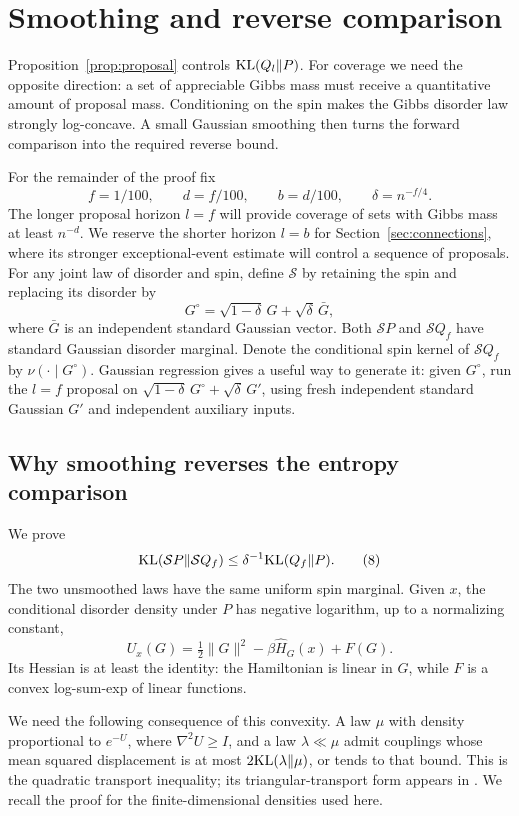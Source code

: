 \section{Smoothing and reverse comparison}\label{sec:reverse}

Proposition~\ref{prop:proposal} controls ${\rm KL}(Q_l\Vert P)$.
For coverage we need the opposite direction: a set of appreciable
Gibbs mass must receive a quantitative amount of proposal mass.
Conditioning on the spin makes the Gibbs disorder law strongly
log-concave. A small Gaussian smoothing then turns the forward
comparison into the required reverse bound.

For the remainder of the proof fix
\[
 f=1/100,\qquad d=f/100,\qquad b=d/100,
 \qquad \delta=n^{-f/4}.
\]
The longer proposal horizon $l=f$ will provide coverage of sets with
Gibbs mass at least $n^{-d}$. We reserve the shorter horizon $l=b$
for Section~\ref{sec:connections}, where its stronger exceptional-event
estimate will control a sequence of proposals. For any joint law of
disorder and spin, define $\mathcal S$ by retaining the spin
and replacing its disorder by
\[
 G^\circ=\sqrt{1-\delta}\,G+\sqrt\delta\,\bar G,
\]
where $\bar G$ is an independent standard Gaussian vector.
Both $\mathcal SP$ and $\mathcal SQ_f$ have standard Gaussian
disorder marginal. Denote the conditional spin kernel of
$\mathcal SQ_f$ by $\nu(\cdot\mid G^\circ)$. Gaussian regression
gives a useful way to generate it: given $G^\circ$, run the
$l=f$ proposal on
$\sqrt{1-\delta}\,G^\circ+\sqrt\delta\,G'$, using fresh independent
standard Gaussian $G'$ and independent auxiliary inputs.

\subsection{Why smoothing reverses the entropy comparison}

We prove
\[
 {\rm KL}(\mathcal SP\Vert\mathcal SQ_f)
 \le\delta^{-1}{\rm KL}(Q_f\Vert P).
 \tag{8}\label{eq:8}
\]
The two unsmoothed laws have the same uniform spin marginal. Given
$x$, the conditional disorder density under $P$ has negative logarithm,
up to a normalizing constant,
\[
 U_x(G)=\tfrac12\|G\|^2-\beta\widehat H_G(x)+F(G).
\]
Its Hessian is at least the identity: the Hamiltonian is linear in
$G$, while $F$ is a convex log-sum-exp of linear functions.

We need the following consequence of this convexity. A law $\mu$
with density proportional to $e^{-U}$, where $\nabla^2U\ge I$,
and a law $\lambda\ll\mu$ admit couplings whose mean squared
displacement is at most $2{\rm KL}(\lambda\Vert\mu)$, or tends
to that bound. This is the quadratic transport inequality; its
triangular-transport form appears in
\cite[Corollary~3.10]{BKM2005}. We recall the proof for the
finite-dimensional densities used here.


